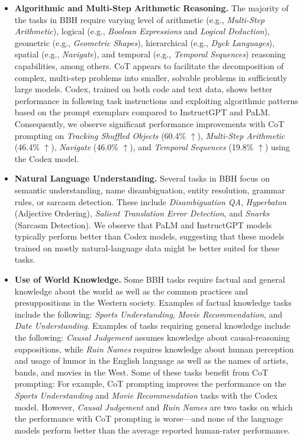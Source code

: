 \begin{itemize}
    \item \textbf{Algorithmic and Multi-Step Arithmetic Reasoning.} The majority of the tasks in BBH require varying level of arithmetic (e.g., \emph{Multi-Step Arithmetic}), logical (e.g., \emph{Boolean Expressions} and \emph{Logical Deduction}), geometric (e.g., \emph{Geometric Shapes}), hierarchical (e.g., \emph{Dyck Languages}), spatial (e.g., \emph{Navigate}), 
and temporal (e.g., \emph{Temporal Sequences}) reasoning capabilities, among others. CoT appears to facilitate the decomposition of complex, multi-step problems into smaller, solvable problems in sufficiently large models. Codex, trained on both code and text data, shows better performance in following task instructions and exploiting algorithmic patterns based on the prompt exemplars compared to InstructGPT and PaLM. Consequently, we observe significant performance improvements with CoT prompting on \emph{Tracking Shuffled Objects} (60.4\% $\uparrow$), \emph{Multi-Step Arithmetic} (46.4\% $\uparrow$), \emph{Navigate} (46.0\% $\uparrow$), and \emph{Temporal Sequences} (19.8\% $\uparrow$) using the Codex model. 
    \item \textbf{Natural Language Understanding.} Several tasks in BBH focus on semantic understanding, name disambiguation, entity resolution, grammar rules, or sarcasm detection. These include \emph{Disambiguation QA}, \emph{Hyperbaton} (Adjective Ordering), \emph{Salient Translation Error Detection}, and \emph{Snarks} (Sarcasm Detection). We observe that PaLM and InstructGPT models typically perform better than Codex models, suggesting that these models trained on mostly natural-language data might be better suited for these tasks.
    \item \textbf{Use of World Knowledge.} Some BBH tasks require factual and general knowledge about the world as well as the common practices and presuppositions in the Western society. Examples of factual knowledge tasks include the following: \emph{Sports Understanding}, \emph{Movie Recommendation}, and \emph{Date Understanding}. Examples of tasks requiring general knowledge include the following: \emph{Causal Judgement} assumes knowledge about causal-reasoning suppositions, while \emph{Ruin Names} requires knowledge about human perception and usage of humor in the English language as well as the names of artists, bands, and movies in the West. Some of these tasks benefit from CoT prompting: For example, CoT prompting improves the performance on the \emph{Sports Understanding} and \emph{Movie Recommendation} tasks with the Codex model. However, \emph{Causal Judgement} and \emph{Ruin Names} are two tasks on which the performance with CoT prompting is worse---and none of the language models perform better than the average reported human-rater performance.

\end{itemize}
